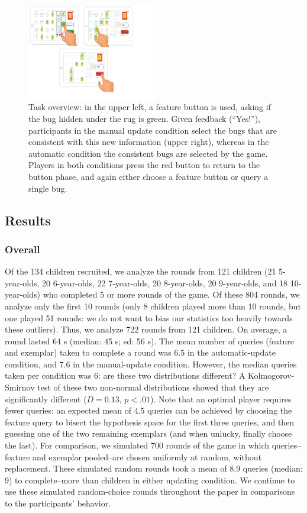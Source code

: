 \documentclass[10pt,letterpaper]{article}
\begin{document}
\begin{figure}[h]
  \centering
  \includegraphics[width=0.5\textwidth]{figures/task_overview}
  \caption{Task overview: in the upper left, a feature button is used, asking if the bug hidden under the rug is green. Given feedback (``Yes!''), participants in the manual update condition select the bugs that are consistent with this new information (upper right), whereas in the automatic condition the consistent bugs are selected by the game. Players in both conditions press the red button to return to the button phase, and again either choose a feature button or query a single bug.}
  \label{fig:task-overview}
\end{figure} 


\subsection{Results}

\subsubsection{Overall}

Of the 134 children recruited, we analyze the rounds from 121 children (21 5-year-olds, 20 6-year-olds, 22 7-year-olds, 20 8-year-olds, 20 9-year-olds, and 18 10-year-olds) who completed 5 or more rounds of the game. Of these 804 rounds, we analyze only the first 10 rounds (only 8 children played more than 10 rounds, but one played 51 rounds: we do not want to bias our statistics too heavily towards these outliers). Thus, we analyze 722 rounds from 121 children. On average, a round lasted 64 s (median: 45 s; sd: 56 s). The mean number of queries (feature and exemplar) taken to complete a round was 6.5 in the automatic-update condition, and 7.6 in the manual-update condition. However, the median queries taken per condition was 6: are these two distributions different? A Kolmogorov-Smirnov test of these two non-normal distributions showed that they are significantly different ($D = 0.13$, $p<.01$). Note that an optimal player requires fewer queries: an expected mean of 4.5 queries can be achieved by choosing the feature query to bisect the hypothesis space for the first three queries, and then guessing one of the two remaining exemplars (and when unlucky, finally choose the last). For comparison, we simulated 700 rounds of the game in which queries--feature and exemplar pooled--are chosen uniformly at random, without replacement. These simulated random rounds took a mean of 8.9 queries (median: 9) to complete--more than children in either updating condition. We continue to use these simulated random-choice rounds throughout the paper in comparisons to the participants' behavior.
\end{document}
